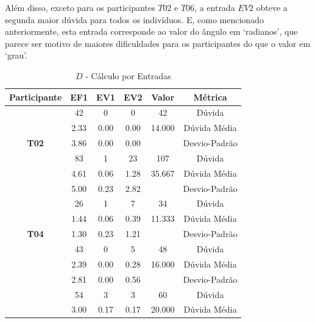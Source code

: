 Além disso, exceto para os participantes $T02$ e $T06$, a entrada $EV2$ obteve a segunda maior dúvida para todos os indivíduos. E, como mencionado anteriormente, esta entrada corresponde ao valor do ângulo em `radianos', que parece ser motivo de maiores dificuldades para os participantes do que o valor em `grau'.

\begin{table}[htbp]
	\centering
	\caption{$D$ - Cálculo por Entradas}
	\begin{tabular}{|c|c|c|c|c|c|}
		\hline
		\rowcolor[HTML]{D0CECE} 
		\textbf{Participante} & \textbf{EF1} & \textbf{EV1} & \textbf{EV2} & \textbf{Valor} & \textbf{Métrica} \\ \hline
		\cellcolor[HTML]{F2F2F2} & 42 & 0 & 0 & 42 & Dúvida \\ \cline{2-6} 
		\rowcolor[HTML]{D9D9D9} 
		\cellcolor[HTML]{F2F2F2} & 2.33 & 0.00 & 0.00 & 14.000 & Dúvida Média \\ \cline{2-6} 
		\multirow{-3}{*}{\cellcolor[HTML]{F2F2F2}\textbf{T02}} & 3.86 & 0.00 & 0.00 &  & Desvio-Padrão \\ \hline
		\rowcolor[HTML]{D9D9D9} 
		\cellcolor[HTML]{F2F2F2} & 83 & 1 & 23 & 107 & Dúvida \\ \cline{2-6} 
		\cellcolor[HTML]{F2F2F2} & 4.61 & 0.06 & 1.28 & 35.667 & Dúvida Média \\ \cline{2-6} 
		\rowcolor[HTML]{D9D9D9} 
		\multirow{-3}{*}{\cellcolor[HTML]{F2F2F2}\textbf{T03}} & 5.00 & 0.23 & 2.82 &  & Desvio-Padrão \\ \hline
		\cellcolor[HTML]{F2F2F2} & 26 & 1 & 7 & 34 & Dúvida \\ \cline{2-6} 
		\rowcolor[HTML]{D9D9D9} 
		\cellcolor[HTML]{F2F2F2} & 1.44 & 0.06 & 0.39 & 11.333 & Dúvida Média \\ \cline{2-6} 
		\multirow{-3}{*}{\cellcolor[HTML]{F2F2F2}\textbf{T04}} & 1.30 & 0.23 & 1.21 &  & Desvio-Padrão \\ \hline
		\rowcolor[HTML]{D9D9D9} 
		\cellcolor[HTML]{F2F2F2} & 43 & 0 & 5 & 48 & Dúvida \\ \cline{2-6} 
		\cellcolor[HTML]{F2F2F2} & 2.39 & 0.00 & 0.28 & 16.000 & Dúvida Média \\ \cline{2-6} 
		\rowcolor[HTML]{D9D9D9} 
		\multirow{-3}{*}{\cellcolor[HTML]{F2F2F2}\textbf{T05}} & 2.81 & 0.00 & 0.56 &  & Desvio-Padrão \\ \hline
		\cellcolor[HTML]{F2F2F2} & 54 & 3 & 3 & 60 & Dúvida \\ \cline{2-6} 
		\rowcolor[HTML]{D9D9D9} 
		\cellcolor[HTML]{F2F2F2} & 3.00 & 0.17 & 0.17 & 20.000 & Dúvida Média \\ \cline{2-6} 

\end{tabular}
\end{table}
